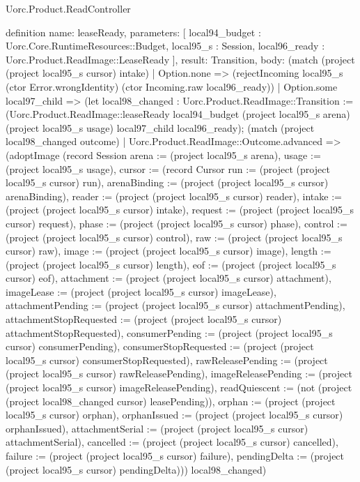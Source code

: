 \begin{lexlean}{Uorc.Product.ReadController}
\begin{semanticmodule}
definition{
  name: leaseReady,
  parameters: [
    local94_budget : Uorc.Core.RuntimeResources::Budget,
    local95_s : Session,
    local96_ready : Uorc.Product.ReadImage::LeaseReady
  ],
  result: Transition,
  body: (match (project (project local95_s cursor) intake)
    | Option.none => (rejectIncoming local95_s (ctor Error.wrongIdentity) (ctor Incoming.raw local96_ready))
    | Option.some local97_child => (let local98_changed : Uorc.Product.ReadImage::Transition := (Uorc.Product.ReadImage::leaseReady local94_budget (project local95_s arena) (project local95_s usage) local97_child local96_ready); (match (project local98_changed outcome)
      | Uorc.Product.ReadImage::Outcome.advanced => (adoptImage (record Session {arena := (project local95_s arena), usage := (project local95_s usage), cursor := (record Cursor {run := (project (project local95_s cursor) run), arenaBinding := (project (project local95_s cursor) arenaBinding), reader := (project (project local95_s cursor) reader), intake := (project (project local95_s cursor) intake), request := (project (project local95_s cursor) request), phase := (project (project local95_s cursor) phase), control := (project (project local95_s cursor) control), raw := (project (project local95_s cursor) raw), image := (project (project local95_s cursor) image), length := (project (project local95_s cursor) length), eof := (project (project local95_s cursor) eof), attachment := (project (project local95_s cursor) attachment), imageLease := (project (project local95_s cursor) imageLease), attachmentPending := (project (project local95_s cursor) attachmentPending), attachmentStopRequested := (project (project local95_s cursor) attachmentStopRequested), consumerPending := (project (project local95_s cursor) consumerPending), consumerStopRequested := (project (project local95_s cursor) consumerStopRequested), rawReleasePending := (project (project local95_s cursor) rawReleasePending), imageReleasePending := (project (project local95_s cursor) imageReleasePending), readQuiescent := (not (project (project local98_changed cursor) leasePending)), orphan := (project (project local95_s cursor) orphan), orphanIssued := (project (project local95_s cursor) orphanIssued), attachmentSerial := (project (project local95_s cursor) attachmentSerial), cancelled := (project (project local95_s cursor) cancelled), failure := (project (project local95_s cursor) failure), pendingDelta := (project (project local95_s cursor) pendingDelta)})}) local98_changed)
}
\end{semanticmodule}
\end{lexlean}
